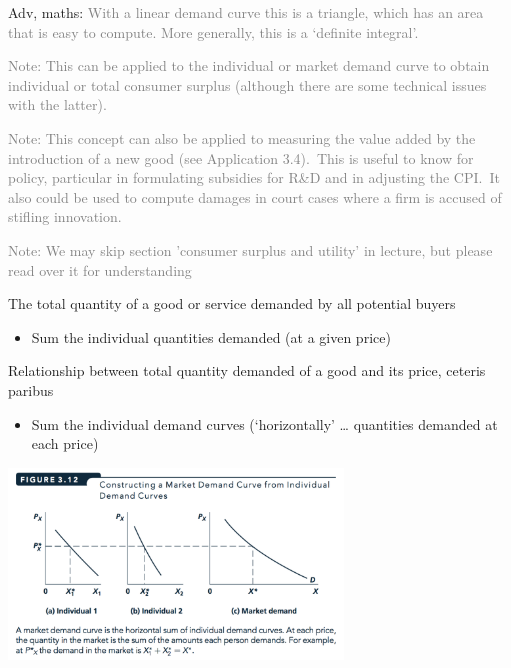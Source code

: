 \documentclass[]{article}
\providecommand{\tightlist}{%
  \setlength{\itemsep}{0pt}\setlength{\parskip}{0pt}}
\begin{document}
\textcolor{RawSienna}{Adv, maths:} \textcolor{gray}{With a linear demand curve this is a triangle, which has an area that is easy to compute. More generally, this is a `definite integral'.}

\textcolor{gray}{Note: This can be applied to the individual or market demand curve to obtain individual or total consumer surplus (although there are some technical issues with the latter).}

\textcolor{gray}{Note: This concept can also be applied to measuring the value added by the introduction of a new good (see Application 3.4).\
This is useful to know for policy, particular in formulating subsidies for R\&D and in adjusting the CPI.\
It also could be used to compute damages in court cases where a firm is accused of stifling innovation.}

\textcolor{gray}{Note: We may skip section 'consumer surplus and utility' in lecture, but please read over it for understanding}

\begin{description}
\tightlist
\item[Market demand]
The total quantity of a good or service demanded by all potential buyers
\end{description}

\begin{itemize}
\tightlist
\item
  Sum the individual quantities demanded (at a given price)
\end{itemize}

\bigskip

\begin{description}
\tightlist
\item[Market demand curve]
Relationship between total quantity demanded of a good and its price, ceteris paribus
\end{description}

\begin{itemize}
\tightlist
\item
  Sum the individual demand curves (`horizontally' \ldots{} quantities demanded at each price)
\end{itemize}

\includegraphics[height=2in]{picsfigs/summarketdemandcurve.png}
\end{document}
